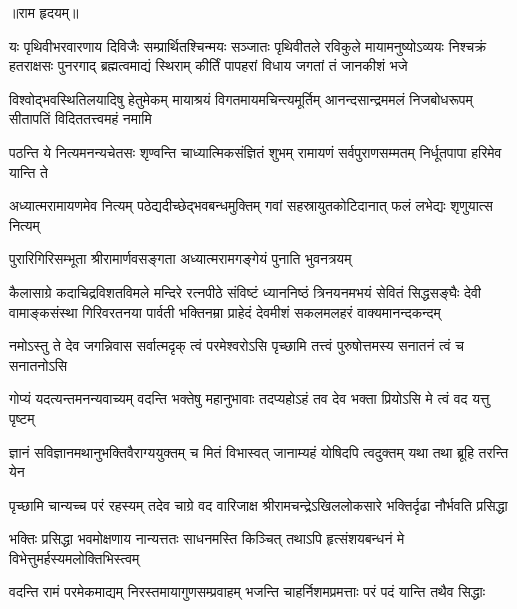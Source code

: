 



॥राम हृदयम्॥

\fourlineindentedshloka
{यः पृथिवीभरवारणाय दिविजैः सम्प्रार्थितश्चिन्मयः}
{सञ्जातः पृथिवीतले रविकुले मायामनुष्योऽव्ययः}
{निश्चक्रं हतराक्षसः पुनरगाद् ब्रह्मत्वमाद्यं स्थिराम्}
{कीर्तिं पापहरां विधाय जगतां तं जानकीशं भजे} %

\fourlineindentedshloka
{विश्वोद्भवस्थितिलयादिषु हेतुमेकम्}
{मायाश्रयं विगतमायमचिन्त्यमूर्तिम्}
{आनन्दसान्द्रममलं निजबोधरूपम्}
{सीतापतिं विदिततत्त्वमहं नमामि} %

\fourlineindentedshloka
{पठन्ति ये नित्यमनन्यचेतसः}
{शृण्वन्ति चाध्यात्मिकसंज्ञितं शुभम्}
{रामायणं सर्वपुराणसम्मतम्}
{निर्धूतपापा हरिमेव यान्ति ते} %

\fourlineindentedshloka
{अध्यात्मरामायणमेव नित्यम्}
{पठेद्यदीच्छेद्भवबन्धमुक्तिम्}
{गवां सहस्रायुतकोटिदानात्}
{फलं लभेद्यः शृणुयात्स नित्यम्} %

\twolineshloka
{पुरारिगिरिसम्भूता श्रीरामार्णवसङ्गता}
{अध्यात्मरामगङ्गेयं पुनाति भुवनत्रयम्} %

\fourlineindentedshloka
{कैलासाग्रे कदाचिद्रविशतविमले मन्दिरे रत्नपीठे}
{संविष्टं ध्याननिष्ठं त्रिनयनमभयं सेवितं सिद्धसङ्घैः}
{देवी वामाङ्कसंस्था गिरिवरतनया पार्वती भक्तिनम्रा}
{प्राहेदं देवमीशं सकलमलहरं वाक्यमानन्दकन्दम्} %


\fourlineindentedshloka
{नमोऽस्तु ते देव जगन्निवास}
{सर्वात्मदृक् त्वं परमेश्वरोऽसि}
{पृच्छामि तत्त्वं पुरुषोत्तमस्य}
{सनातनं त्वं च सनातनोऽसि} %

\fourlineindentedshloka
{गोप्यं यदत्यन्तमनन्यवाच्यम्}
{वदन्ति भक्तेषु महानुभावाः}
{तदप्यहोऽहं तव देव भक्ता}
{प्रियोऽसि मे त्वं वद यत्तु पृष्टम्} %

\fourlineindentedshloka
{ज्ञानं सविज्ञानमथानुभक्तिवैराग्ययुक्तम्}
{च मितं विभास्वत्}
{जानाम्यहं योषिदपि त्वदुक्तम्}
{यथा तथा ब्रूहि तरन्ति येन} %

\fourlineindentedshloka
{पृच्छामि चान्यच्च परं रहस्यम्}
{तदेव चाग्रे वद वारिजाक्ष}
{श्रीरामचन्द्रेऽखिललोकसारे}
{भक्तिर्दृढा नौर्भवति प्रसिद्धा} %

\fourlineindentedshloka
{भक्तिः प्रसिद्धा भवमोक्षणाय}
{नान्यत्ततः साधनमस्ति किञ्चित्}
{तथाऽपि हृत्संशयबन्धनं मे}
{विभेत्तुमर्हस्यमलोक्तिभिस्त्वम्} %

\fourlineindentedshloka
{वदन्ति रामं परमेकमाद्यम्}
{निरस्तमायागुणसम्प्रवाहम्}
{भजन्ति चाहर्निशमप्रमत्ताः}
{परं पदं यान्ति तथैव सिद्धाः} %

